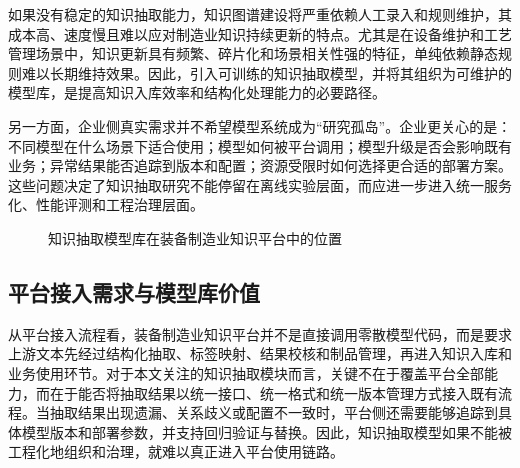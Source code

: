 如果没有稳定的知识抽取能力，知识图谱建设将严重依赖人工录入和规则维护，其成本高、速度慢且难以应对制造业知识持续更新的特点。尤其是在设备维护和工艺管理场景中，知识更新具有频繁、碎片化和场景相关性强的特征，单纯依赖静态规则难以长期维持效果。因此，引入可训练的知识抽取模型，并将其组织为可维护的模型库，是提高知识入库效率和结构化处理能力的必要路径。

另一方面，企业侧真实需求并不希望模型系统成为“研究孤岛”。企业更关心的是：不同模型在什么场景下适合使用；模型如何被平台调用；模型升级是否会影响既有业务；异常结果能否追踪到版本和配置；资源受限时如何选择更合适的部署方案。这些问题决定了知识抽取研究不能停留在离线实验层面，而应进一步进入统一服务化、性能评测和工程治理层面。

\begin{figure}[htbp]
  \centering
  \caption{知识抽取模型库在装备制造业知识平台中的位置}
  \label{fig:intro_knowledge_flow}
\end{figure}

\subsection{平台接入需求与模型库价值}
从平台接入流程看，装备制造业知识平台并不是直接调用零散模型代码，而是要求上游文本先经过结构化抽取、标签映射、结果校核和制品管理，再进入知识入库和业务使用环节。对于本文关注的知识抽取模块而言，关键不在于覆盖平台全部能力，而在于能否将抽取结果以统一接口、统一格式和统一版本管理方式接入既有流程。当抽取结果出现遗漏、关系歧义或配置不一致时，平台侧还需要能够追踪到具体模型版本和部署参数，并支持回归验证与替换。因此，知识抽取模型如果不能被工程化地组织和治理，就难以真正进入平台使用链路。

